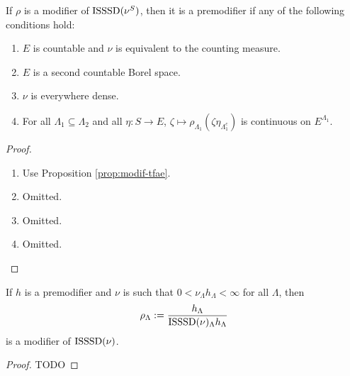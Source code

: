 \begin{lemma}
    \label{lem:modif-premodif}
    If $\rho$ is a modifier of $\operatorname{ISSSD}(\nu^S)$, then it is a premodifier if any of the following conditions hold:
    \begin{enumerate}
        \item $E$ is countable and $\nu$ is equivalent to the counting measure.
        \item $E$ is a second countable Borel space.
        \item $\nu$ is everywhere dense.
        \item For all $\Lambda_1 \subseteq \Lambda_2$ and all $\eta : S \to E$, $\zeta \mapsto \rho_{\Lambda_1}(\zeta \eta_{\Lambda_1^c})$ is continuous on $E^{\Lambda_1}$.
    \end{enumerate}
\end{lemma}
\begin{proof}

    \begin{enumerate}
        \item Use Proposition \ref{prop:modif-tfae}.
        \item Omitted.
        \item Omitted.
        \item Omitted.
    \end{enumerate}
\end{proof}

\begin{lemma}
    \label{lem:premodif-modif}
    \leanok
    If $h$ is a premodifier and $\nu$ is such that $0 < \nu_\Lambda h_\Lambda < \infty$ for all $\Lambda$, then
    $$\rho_\Lambda := \frac{h_\Lambda}{\operatorname{ISSSD}(\nu)_\Lambda h_\Lambda}$$
    is a modifier of $\operatorname{ISSSD}(\nu)$.
\end{lemma}
\begin{proof}

    TODO
\end{proof}

